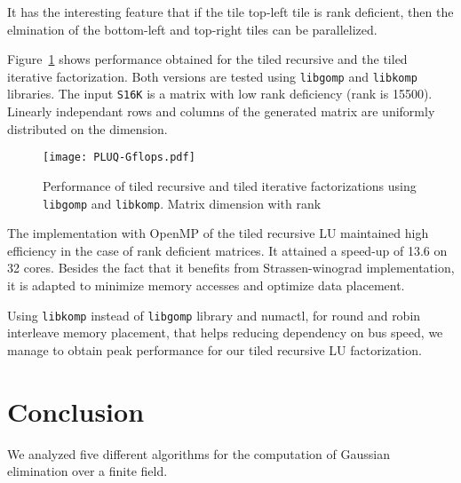 \documentclass{article}
\newcommand{\libkomp}{\texttt{libkomp}\xspace}
\newcommand{\libgomp}{\texttt{libgomp}\xspace}
\begin{document}
 
 
 
 
 
 
It has the interesting feature that if the tile top-left tile is rank deficient,
then the elmination of the bottom-left and top-right tiles can be parallelized.
 
 
 
 
 
 
 
 
 
 
 

Figure~\ref{fig:PLUQ-Gflops} shows performance obtained for the tiled recursive
and the tiled iterative factorization. Both
versions are tested using \libgomp and \libkomp libraries. The input \texttt{S16K} is a
 matrix with low rank deficiency (rank is 15500). Linearly
independant rows and columns of the generated matrix are uniformly distributed
on the dimension. 

 

\begin{figure}[ht!]
\centering
\texttt{[image: PLUQ-Gflops.pdf]}\\
\caption{Performance of tiled recursive and tiled iterative factorizations
  using  \libgomp and \libkomp. Matrix dimension  with rank }
\label{fig:PLUQ-Gflops}
\end{figure}

 
 
 
 
 

 
 
 
The implementation with OpenMP of the tiled recursive LU maintained high
efficiency in the case of rank deficient matrices. It attained a speed-up of
13.6 on 32 cores. Besides the fact that it benefits from Strassen-winograd
implementation, it is adapted to minimize memory accesses and optimize data
placement.
 
 
Using \libkomp instead of
\libgomp library and numactl, for round and robin interleave memory placement,
that helps reducing dependency on bus speed, we manage to obtain peak
performance for our tiled recursive LU factorization.

 
 
 
 
 
 
 
 
 

 

\section{Conclusion}
We analyzed five different algorithms for the computation of Gaussian
elimination over a finite field.
 
\end{document}
